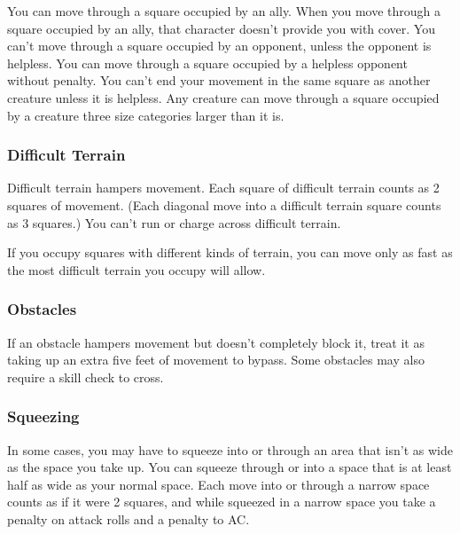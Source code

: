  You can move through a square occupied by an ally. When you move through a square occupied by an ally, that character doesn't provide you with cover.
 You can't move through a square occupied by an opponent, unless the opponent is helpless. You can move through a square occupied by a helpless opponent without penalty.
 You can't end your movement in the same square as another creature unless it is helpless.
 Any creature can move through a square occupied by a creature three size categories larger than it is.

\subsubsection{Difficult Terrain}

Difficult terrain hampers movement. Each square of difficult terrain counts as 2 squares of movement. (Each diagonal move into a difficult terrain square counts as 3 squares.) You can't run or charge across difficult terrain.

If you occupy squares with different kinds of terrain, you can move only as fast as the most difficult terrain you occupy will allow.

\subsubsection{Obstacles}

If an obstacle hampers movement but doesn't completely block it, treat it as taking up an extra five feet of movement to bypass. Some obstacles may also require a skill check to cross.

\subsubsection{Squeezing}

In some cases, you may have to squeeze into or through an area that isn't as wide as the space you take up. You can squeeze through or into a space that is at least half as wide as your normal space. Each move into or through a narrow space counts as if it were 2 squares, and while squeezed in a narrow space you take a  penalty on attack rolls and a  penalty to AC.


